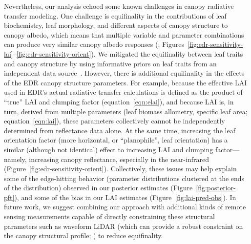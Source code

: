 Nevertheless, our analysis echoed some known challenges in canopy radiative transfer modeling.
One challenge is equifinality in the contributions of leaf biochemistry, leaf morphology, and different aspects of canopy structure to canopy albedo, which means that multiple variable and parameter combinations can produce very similar canopy albedo responses (\citealt{lewis2007spectral}; Figures~\ref{fig:edr-sensitivity-lai}--\ref{fig:edr-sensitivity-orient}).
We mitigated the equifinality between leaf traits and canopy structure by using informative priors on leaf traits from an independent data source~\citep{shiklomanov_dissertation}.
However, there is additional equifinality in the effects of the EDR canopy structure parameters.
For example, because the effective LAI used in EDR’s actual radiative transfer calculations is defined as the product of ``true'' LAI and clumping factor (equation~\ref{eqn:elai}), and because LAI is, in turn, derived from multiple parameters (leaf biomass allometry, specific leaf area; equation~\ref{eqn:lai}), these parameters collectively cannot be independently determined from reflectance data alone.
At the same time, increasing the leaf orientation factor (more horizontal, or ``planophile'', leaf orientation) has a similar (although not identical) effect to increasing LAI and clumping factor---namely, increasing canopy reflectance, especially in the near-infrared (Figure~\ref{fig:edr-sensitivity-orient}).
Collectively, these issues may help explain some of the edge-hitting behavior (parameter distributions clustered at the ends of the distribution) observed in our posterior estimates (Figure~\ref{fig:posterior-pft}), and some of the bias in our LAI estimates (Figure~\ref{fig:lai-pred-obs}).
In future work, we suggest combining our approach with additional kinds of remote sensing measurements capable of directly constraining these structural parameters such as waveform LiDAR (which can provide a robust constraint on the canopy structural profile; \citealt{ferraz2020tropical}) to reduce equifinality.

